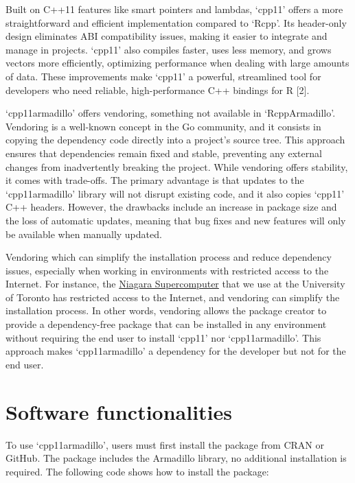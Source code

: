 \documentclass[preprint,12pt, a4paper]{elsarticle}
\begin{document}
Built on C++11 features like smart pointers and lambdas, `cpp11' offers
a more straightforward and efficient implementation compared to `Rcpp'.
Its header-only design eliminates ABI compatibility issues, making it
easier to integrate and manage in projects. `cpp11' also compiles
faster, uses less memory, and grows vectors more efficiently, optimizing
performance when dealing with large amounts of data. These improvements
make `cpp11' a powerful, streamlined tool for developers who need
reliable, high-performance C++ bindings for R {[}2{]}.

`cpp11armadillo' offers vendoring, something not available in
`RcppArmadillo'. Vendoring is a well-known concept in the Go community,
and it consists in copying the dependency code directly into a project's
source tree. This approach ensures that dependencies remain fixed and
stable, preventing any external changes from inadvertently breaking the
project. While vendoring offers stability, it comes with trade-offs. The
primary advantage is that updates to the `cpp11armadillo' library will
not disrupt existing code, and it also copies `cpp11' C++ headers.
However, the drawbacks include an increase in package size and the loss
of automatic updates, meaning that bug fixes and new features will only
be available when manually updated.

Vendoring which can simplify the installation process and reduce
dependency issues, especially when working in environments with
restricted access to the Internet. For instance, the
\href{https://docs.scinet.utoronto.ca/index.php/Niagara_Quickstart}{Niagara
Supercomputer} that we use at the University of Toronto has restricted
access to the Internet, and vendoring can simplify the installation
process. In other words, vendoring allows the package creator to provide
a dependency-free package that can be installed in any environment
without requiring the end user to install `cpp11' nor `cpp11armadillo'.
This approach makes `cpp11armadillo' a dependency for the developer but
not for the end user.

\section{Software functionalities}\label{software-functionalities}

To use `cpp11armadillo', users must first install the package from CRAN
or GitHub. The package includes the Armadillo library, no additional
installation is required. The following code shows how to install the
package:
\end{document}
